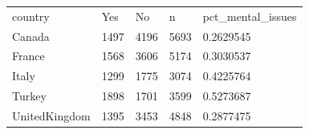\begin{table}
\centering
\begin{tabular}{lllll}
country & Yes & No & n & pct_mental_issues \\
Canada & 1497 & 4196 & 5693 & 0.2629545 \\
France & 1568 & 3606 & 5174 & 0.3030537 \\
Italy & 1299 & 1775 & 3074 & 0.4225764 \\
Turkey & 1898 & 1701 & 3599 & 0.5273687 \\
UnitedKingdom & 1395 & 3453 & 4848 & 0.2877475 \\
\end{tabular}
\end{table}
